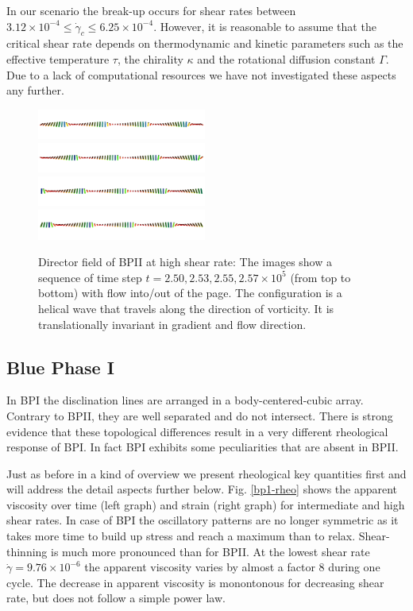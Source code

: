 \documentclass[aps,pre,reprint,superscriptaddress, twocolumn]{revtex4}
\newcommand{\e}[1]{\times10^{#1}}
\newcommand{\gd}{\dot{\gamma}}
\begin{document}
In our scenario the break-up occurs for shear rates between $3.12\e{-4}\le\gd_c\le 6.25\e{-4}$.
However, it is reasonable to assume that the critical shear rate depends on thermodynamic and kinetic parameters
such as the effective temperature $\tau$, the chirality $\kappa$ and the rotational diffusion constant $\Gamma$.
Due to a lack of computational resources we have not investigated these aspects any further.

\begin{figure}[htpb]
\includegraphics[width=0.495\textwidth]{dir+y-250k_run949.png}
\includegraphics[width=0.495\textwidth]{dir+y-253k_run949.png}
\includegraphics[width=0.495\textwidth]{dir+y-255k_run949.png}
\includegraphics[width=0.495\textwidth]{dir+y-257k_run949.png}
\caption{Director field of BPII at high shear rate: The images show a sequence of time step $t=2.50, 2.53,2.55, 2.57\e{5}$ (from top to bottom) with flow into/out of the page. The configuration is a helical wave that travels along the direction of vorticity. It is translationally invariant in gradient and flow direction.}
\label{bp2-high}
\end{figure}

\subsection{Blue Phase I}

In BPI the disclination lines are arranged in a body-centered-cubic array.
Contrary to BPII, they are well separated and do not intersect. 
There is strong evidence that these topological differences result in 
a very different rheological response of BPI. In fact BPI exhibits some 
peculiarities that are absent in BPII.

Just as before in a kind of overview we present rheological key quantities first and 
will address the detail aspects further below. 
Fig. \ref{bp1-rheo} shows the apparent viscosity over time (left graph) and 
strain (right graph) for intermediate and high shear rates. In case of BPI the oscillatory patterns
are no longer symmetric as it takes more time to build up stress and reach a maximum than to 
relax. Shear-thinning is much more pronounced than for BPII. At the lowest shear rate $\gd=9.76\e{-6}$
the apparent viscosity varies by almost a factor 8 during one cycle.
The decrease in apparent viscosity is monontonous for decreasing shear rate, but does not 
follow a simple power law. 
\end{document}
